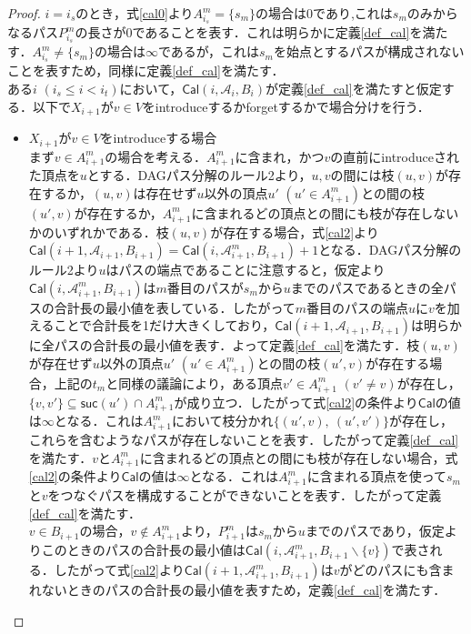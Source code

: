 \begin{proof}
    $i=i_s$のとき，式\ref{cal0}より$A^m_{i_s} = \{s_m\}$の場合は0であり,これは$s_m$のみからなるパス$P^m_{i_s}$の長さが0であることを表す．これは明らかに定義\ref{def_cal}を満たす．$A^m_{i_s} \neq \{s_m\}$の場合は$\infty$であるが，これは$s_m$を始点とするパスが構成されないことを表すため，同様に定義\ref{def_cal}を満たす．\\
    ある$i$ $(i_s \leq i < i_t)$において，$\mathsf{Cal}(i, \mathscr{A}_i, B_i)$が定義\ref{def_cal}を満たすと仮定する．以下で$X_{i+1}$が$v \in V$をintroduceするかforgetするかで場合分けを行う．
    \begin{itemize}
        \item $X_{i+1}$が$v \in V$をintroduceする場合 \\
        まず$v \in A^m_{i+1}$の場合を考える．$A^m_{i+1}$に含まれ，かつ$v$の直前にintroduceされた頂点を$u$とする．DAGパス分解のルール2より，$u, v$の間には枝$(u, v)$が存在するか，$(u, v)$は存在せず$u$以外の頂点$u'$ $(u' \in A^m_{i+1})$との間の枝$(u', v)$が存在するか，$A^m_{i+1}$に含まれるどの頂点との間にも枝が存在しないかのいずれかである．枝$(u, v)$が存在する場合，式\ref{cal2}より$\mathsf{Cal}(i+1, \mathscr{A}_{i+1}, B_{i+1}) = \mathsf{Cal}(i, \mathscr{A}^m_{i+1}, B_{i+1})+1$となる．DAGパス分解のルール2より$u$はパスの端点であることに注意すると，仮定より$\mathsf{Cal}(i, \mathscr{A}^m_{i+1}, B_{i+1})$は$m$番目のパスが$s_m$から$u$までのパスであるときの全パスの合計長の最小値を表している．したがって$m$番目のパスの端点$u$に$v$を加えることで合計長を1だけ大きくしており，$\mathsf{Cal}(i+1, \mathscr{A}_{i+1}, B_{i+1})$は明らかに全パスの合計長の最小値を表す．よって定義\ref{def_cal}を満たす．枝$(u, v)$が存在せず$u$以外の頂点$u'$ $(u' \in A^m_{i+1})$との間の枝$(u', v)$が存在する場合，上記の$t_m$と同様の議論により，ある頂点$v' \in A^m_{i+1}$ $(v' \neq v)$が存在し，$\{v, v'\} \subseteq \mathsf{suc}(u') \cap A^m_{i+1}$が成り立つ．したがって式\ref{cal2}の条件より$\mathsf{Cal}$の値は$\infty$となる．これは$A^m_{i+1}$において枝分かれ$\{(u', v),\ (u', v')\}$が存在し，これらを含むようなパスが存在しないことを表す．したがって定義\ref{def_cal}を満たす．$v$と$A^m_{i+1}$に含まれるどの頂点との間にも枝が存在しない場合，式\ref{cal2}の条件より$\mathsf{Cal}$の値は$\infty$となる．これは$A^m_{i+1}$に含まれる頂点を使って$s_m$と$v$をつなぐパスを構成することができないことを表す．したがって定義\ref{def_cal}を満たす．\\
        $v \in B_{i+1}$の場合，$v \notin A^m_{i+1}$より，$P^m_{i+1}$は$s_m$から$u$までのパスであり，仮定よりこのときのパスの合計長の最小値は$\mathsf{Cal}(i, \mathscr{A}^m_{i+1}, B_{i+1} \backslash \{v\})$で表される．したがって式\ref{cal2}より$\mathsf{Cal}(i+1, \mathscr{A}^m_{i+1}, B_{i+1})$は$v$がどのパスにも含まれないときのパスの合計長の最小値を表すため，定義\ref{def_cal}を満たす．\\

\end{itemize}
\end{proof}
